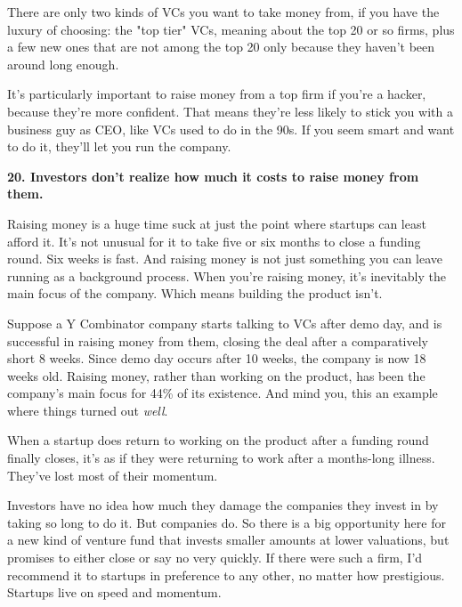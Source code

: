 There are only two
                  kinds of VCs you want to take money from, if you have the
                  luxury of choosing: the "top tier" VCs, meaning about the top
                  20 or so firms, plus a few new ones that are not among the top
                  20 only because they haven't been around long enough.

It's
                  particularly important to raise money from a top firm if
                  you're a hacker, because they're more confident. That means
                  they're less likely to stick you with a business guy as CEO,
                  like VCs used to do in the 90s. If you seem smart and want to
                  do it, they'll let you run the company.

\textbf{20. Investors don't realize how much it costs to raise
                    money from them.}

Raising money is a huge time suck at just the
                  point where startups can least afford it. It's not unusual for
                  it to take five or six months to close a funding round. Six
                  weeks is fast. And raising money is not just something you can
                  leave running as a background process. When you're raising
                  money, it's inevitably the main focus of the company. Which
                  means building the product isn't.

Suppose a Y
                  Combinator company starts talking to VCs after demo day, and
                  is successful in raising money from them, closing the deal
                  after a comparatively short 8 weeks. Since demo day occurs
                  after 10 weeks, the company is now 18 weeks old. Raising
                  money, rather than working on the product, has been the
                  company's main focus for 44\% of its existence. And mind you,
                  this an example where things turned out
                  \emph{well}.

When a startup does return to working
                  on the product after a funding round finally closes, it's as
                  if they were returning to work after a months-long illness.
                  They've lost most of their momentum.

Investors have
                  no idea how much they damage the companies they invest in by
                  taking so long to do it. But companies do. So there is a big
                  opportunity here for a new kind of venture fund that invests
                  smaller amounts at lower valuations, but promises to either
                  close or say no very quickly. If there were such a firm, I'd
                  recommend it to startups in preference to any other, no matter
                  how prestigious. Startups live on speed and momentum.

